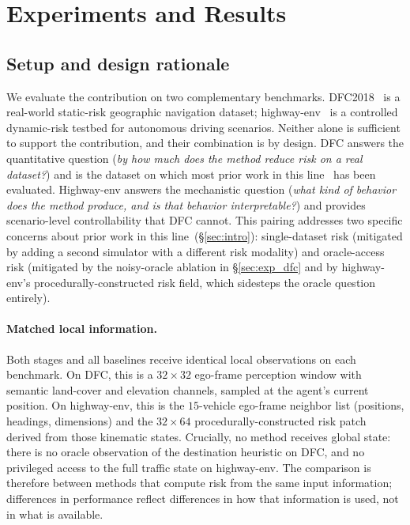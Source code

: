 \section{Experiments and Results}

\subsection{Setup and design rationale}
\label{sec:exp_setup}

We evaluate the contribution on two complementary benchmarks.
DFC2018~\citep{dfc2018} is a real-world static-risk geographic navigation dataset; highway-env~\citep{highway-env} is a controlled dynamic-risk testbed for autonomous driving scenarios.
Neither alone is sufficient to support the contribution, and their combination is by design.
DFC answers the quantitative question (\emph{by how much does the method reduce risk on a real dataset?}) and is the dataset on which most prior work in this line~\citep{prev_work_1, prev_work_2} has been evaluated.
Highway-env answers the mechanistic question (\emph{what kind of behavior does the method produce, and is that behavior interpretable?}) and provides scenario-level controllability that DFC cannot.
This pairing addresses two specific concerns about prior work in this line~(\S\ref{sec:intro}): single-dataset risk (mitigated by adding a second simulator with a different risk modality) and oracle-access risk (mitigated by the noisy-oracle ablation in \S\ref{sec:exp_dfc} and by highway-env's procedurally-constructed risk field, which sidesteps the oracle question entirely).

\paragraph{Matched local information.}
Both stages and all baselines receive identical local observations on each benchmark.
On DFC, this is a $32 \times 32$ ego-frame perception window with semantic land-cover and elevation channels, sampled at the agent's current position.
On highway-env, this is the $15$-vehicle ego-frame neighbor list (positions, headings, dimensions) and the $32 \times 64$ procedurally-constructed risk patch derived from those kinematic states.
Crucially, no method receives global state: there is no oracle observation of the destination heuristic on DFC, and no privileged access to the full traffic state on highway-env.
The comparison is therefore between methods that compute risk from the same input information; differences in performance reflect differences in how that information is used, not in what is available.

